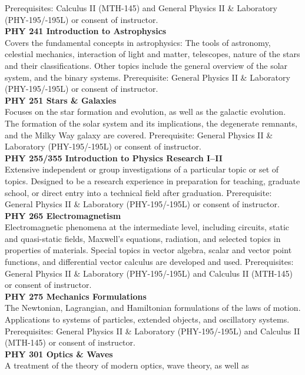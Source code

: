 \documentclass[
  letterpaper,
]{scrbook}
\begin{document}
Prerequisites: Calculus II (MTH-145) and General Physics II \&
Laboratory (PHY-195/-195L) or consent of instructor.\\
\textbf{PHY 241 Introduction to Astrophysics}\\
Covers the fundamental concepts in astrophysics: The tools of astronomy,
celestial mechanics, interaction of light and matter, telescopes, nature
of the stars and their classifications. Other topics include the general
overview of the solar system, and the binary systems. Prerequisite:
General Physics II \& Laboratory (PHY-195/-195L) or consent of
instructor.\\
\textbf{PHY 251 Stars \& Galaxies}\\
Focuses on the star formation and evolution, as well as the galactic
evolution. The formation of the solar system and its implications, the
degenerate remnants, and the Milky Way galaxy are covered. Prerequisite:
General Physics II \& Laboratory (PHY-195/-195L) or consent of
instructor.\\
\textbf{PHY 255/355 Introduction to Physics Research I--II}\\
Extensive independent or group investigations of a particular topic or
set of topics. Designed to be a research experience in preparation for
teaching, graduate school, or direct entry into a technical field after
graduation. Prerequisite: General Physics II \& Laboratory
(PHY-195/-195L) or consent of instructor.\\
\textbf{PHY 265 Electromagnetism}\\
Electromagnetic phenomena at the intermediate level, including circuits,
static and quasi-static fields, Maxwell's equations, radiation, and
selected topics in properties of materials. Special topics in vector
algebra, scalar and vector point functions, and differential vector
calculus are developed and used. Prerequisites: General Physics II \&
Laboratory (PHY-195/-195L) and Calculus II (MTH-145) or consent of
instructor.\\
\textbf{PHY 275 Mechanics Formulations}\\
The Newtonian, Lagrangian, and Hamiltonian formulations of the laws of
motion. Applications to systems of particles, extended objects, and
oscillatory systems. Prerequisites: General Physics II \& Laboratory
(PHY-195/-195L) and Calculus II (MTH-145) or consent of instructor.\\
\textbf{PHY 301 Optics \& Waves}\\
A treatment of the theory of modern optics, wave theory, as well as
\end{document}
